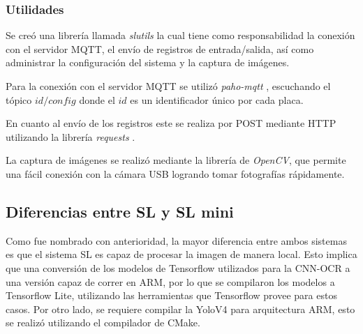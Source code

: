 \subsubsection*{Utilidades}

Se creó una librería llamada \textit{slutils} la cual tiene como responsabilidad la conexión con el servidor MQTT, el envío de registros de entrada/salida, así como administrar la configuración del sistema y la captura de imágenes.

Para la conexión con el servidor MQTT se utilizó \textit{paho-mqtt} \cite{craggs_documentacion_nodate}, escuchando el tópico \textit{$id/config$} donde el $id$ es un identificador único por cada placa.

En cuanto al envío de los registros este se realiza por POST mediante HTTP utilizando la librería \textit{requests} \cite{python_software_foundation_documentacion_nodate}.

La captura de imágenes se realizó mediante la librería de \textit{OpenCV}, que permite una fácil conexión con la cámara USB logrando tomar fotografías rápidamente.

\subsection{Diferencias entre SL y SL mini}

Como fue nombrado con anterioridad, la mayor diferencia entre ambos sistemas es que el sistema SL es capaz de procesar la imagen de manera local. Esto implica que una conversión de los modelos de Tensorflow \cite{google_tensorflow_nodate} utilizados para la CNN-OCR a una versión capaz de correr en ARM, por lo que se compilaron los modelos a Tensorflow Lite, utilizando las herramientas que Tensorflow provee para estos casos. Por otro lado, se requiere compilar la YoloV4 para arquitectura ARM, esto se realizó utilizando el compilador de CMake.

